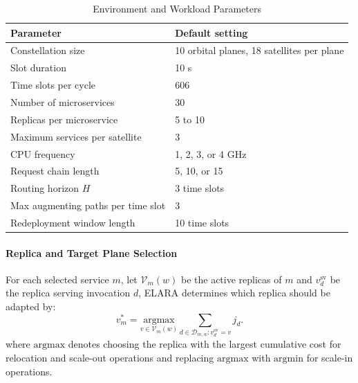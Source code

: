 \documentclass[10pt, conference, letterpaper]{IEEEtran}
\begin{document}
\begin{table}[!b]
\centering
\vspace{-0.65cm}
\caption{Environment and Workload Parameters}
\label{tab:env_params}
\setlength{\tabcolsep}{2.8pt}
\scriptsize
\vspace{-0.2cm}
\begin{tabular}{l|l}
\toprule
\textbf{Parameter} & \textbf{Default setting} \\
\midrule
Constellation size & 10 orbital planes, 18 satellites per plane \\
Slot duration & 10 s \\
Time slots per cycle & 606 \\
Number of microservices & 30 \\
Replicas per microservice & 5 to 10 \\
Maximum services per satellite & 3 \\
CPU frequency & 1, 2, 3, or 4 GHz \\
Request chain length & 5, 10, or 15 \\
Routing horizon $H$ & 3 time slots \\
Max augmenting paths per time slot & 3 \\
Redeployment window length & 10 time slots \\
\bottomrule
\end{tabular}
\vspace{-0.15cm}
\end{table}


\paragraph{Replica and Target Plane Selection}
For each selected service $m$, let $\mathcal V_m(w)$ be the active replicas of $m$ and $v_d^{\text{sv}}$ be the replica serving invocation $d$, ELARA determines which replica should be adapted by:
\begin{equation}
v_m^{*}= \underset{{v\in\mathcal V_m(w)}}{\mathrm{argmax}}
{\sum}_{d\in\mathcal D_{m,w}:v_d^{\text{sv}}=v}j_d.
\label{eq:new_bottleneck_replica}
\end{equation}
where $\mathrm{argmax}$ denotes choosing the replica with the largest cumulative cost for relocation and scale-out operations and replacing $\mathrm{argmax}$ with $\mathrm{argmin}$ for scale-in operations.
\end{document}
